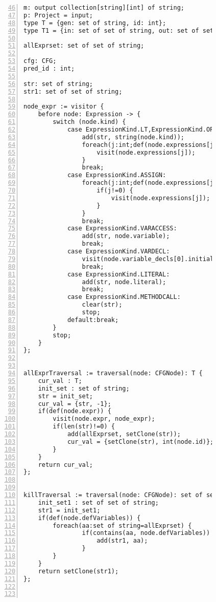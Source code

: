 \begin{figure}[ht!]
\begin{lstlisting}[numbers=left, tabsize=4, escapechar=@, caption={Common subexpression detection},label={lst:csd-code},firstline=46, firstnumber=46,lastline=101] 
m: output collection[string][int] of string;
p: Project = input;
type T = {gen: set of string, id: int};
type T1 = {in: set of set of string, out: set of set of string, id : int};

allExprset: set of set of string;

cfg: CFG;
pred_id : int;

str: set of string;
str1: set of set of string;

node_expr := visitor {
	before node: Expression -> {
		switch (node.kind) {
			case ExpressionKind.LT,ExpressionKind.OP_ADD, ExpressionKind.OP_SUB, ExpressionKind.OP_INC, ExpressionKind.OP_MULT, ExpressionKind.OP_DIV, ExpressionKind.OP_MOD, ExpressionKind.OP_DEC, ExpressionKind.GT, ExpressionKind.EQ, ExpressionKind.NEQ, ExpressionKind.LTEQ, ExpressionKind.GTEQ, ExpressionKind.LOGICAL_NOT, ExpressionKind.LOGICAL_AND, ExpressionKind.LOGICAL_OR, ExpressionKind.BIT_AND, ExpressionKind.BIT_OR, ExpressionKind.BIT_NOT, ExpressionKind.BIT_XOR, ExpressionKind.BIT_LSHIFT, ExpressionKind.BIT_RSHIFT, ExpressionKind.BIT_UNSIGNEDRSHIFT:
				add(str, string(node.kind)); 
				foreach(j:int;def(node.expressions[j])) {
					visit(node.expressions[j]);
				}
				break;
			case ExpressionKind.ASSIGN:
				foreach(j:int;def(node.expressions[j])) {
					if(j!=0) {
						visit(node.expressions[j]);
					}
				}
				break;
			case ExpressionKind.VARACCESS:
				add(str, node.variable);
				break;
			case ExpressionKind.VARDECL:
				visit(node.variable_decls[0].initializer);
				break;
			case ExpressionKind.LITERAL:
				add(str, node.literal);
				break;
			case ExpressionKind.METHODCALL:
				clear(str);
				stop;
			default:break;
		}
		stop;
	}
};


allExprTraversal := traversal(node: CFGNode): T {
	cur_val : T;
	init_set : set of string;
	str = init_set;
	cur_val = {str, -1};
	if(def(node.expr)) {
		visit(node.expr, node_expr);
		if(len(str)!=0) {
			add(allExprset, setClone(str));
			cur_val = {setClone(str), int(node.id)};
		}
	}
	return cur_val;
};


killTraversal := traversal(node: CFGNode): set of set of string {
	init_set1 : set of set of string;
	str1 = init_set1;
	if(def(node.defVariables)) {
		foreach(aa:set of string=allExprset) {
				if(contains(aa, node.defVariables)) {
					add(str1, aa);
				}
		}
	}
	return setClone(str1);
};



\end{lstlisting}
\end{figure}
